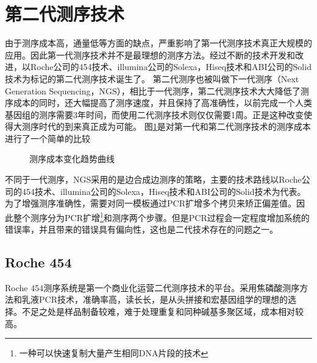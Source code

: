 \documentclass[12pt]{article} %
\begin{document}
\section{第二代测序技术}
 由于测序成本高，通量低等方面的缺点，严重影响了第一代测序技术真正大规模的应用。因此第一代测序技术并不是最理想的测序方法。经过不断的技术开发和改进，以Roche公司的454技术、illumina公司的Solexa，Hiseq技术和ABI公司的Solid技术为标记的第二代测序技术诞生了。 第二代测序也被叫做下一代测序（Next Generation Sequencing，NGS），相比于一代测序，第二代测序技术大大降低了测序成本的同时，还大幅提高了测序速度，并且保持了高准确性，以前完成一个人类基因组的测序需要3年时间，而使用二代测序技术则仅仅需要1周。正是这种改变使得大测序时代的到来真正成为可能。 图\ref{fig:expenschange}是对第一代和第二代测序技术的测序成本进行了一个简单的比较\cite{Paper:Niedringhaus}
\begin{figure}[H] %
	\caption{测序成本变化趋势曲线}
	\label{fig:expenschange}
\end{figure}


不同于一代测序，NGS采用的是边合成边测序的策略，主要的技术路线以Roche公司的454技术、illumina公司的Solexa，Hiseq技术和ABI公司的Solid技术为代表。为了增强测序准确性，需要对同一模板通过PCR扩增多个拷贝来矫正偏差值。因此整个测序分为PCR扩增\footnote{ 一种可以快速复制大量产生相同DNA片段的技术}和测序两个步骤。但是PCR过程会一定程度增加系统的错误率，并且带来的错误具有偏向性，这也是二代技术存在的问题之一。

\subsection{Roche 454}
Roche 454测序系统是第一个商业化运营二代测序技术的平台。采用焦磷酸测序方法和乳液PCR技术，准确率高，读长长，是从头拼接和宏基因组学的理想的选择。不足之处是样品制备较难，难于处理重复和同种碱基多聚区域，成本相对较高。
\end{document}
